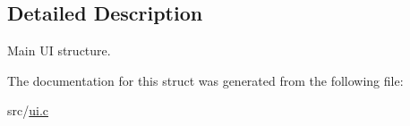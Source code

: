 \subsection{Detailed Description}
Main UI structure. 

The documentation for this struct was generated from the following file\+:\begin{DoxyCompactItemize}
\item 
src/\hyperlink{ui_8c}{ui.\+c}\end{DoxyCompactItemize}
